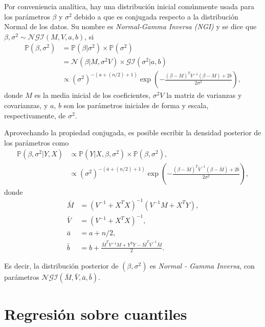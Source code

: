 Por conveniencia anal\'itica, hay una distribuci\'on inicial com\'unmente usada para los par\'ametros $\beta$ y $\sigma^2$ debido a que es conjugada respecto a la distribuci\'on Normal de los datos. Su nombre es \textit{Normal-Gamma Inversa (NGI)} y se dice que $\beta,\sigma^2 \sim \mathcal{NGI}(M,V,a,b)$, si
\begin{equation*}
\begin{aligned}
    \mathbb{P}(\beta,\sigma^2) 
    &= \mathbb{P}(\beta|\sigma^2) \times \mathbb{P}(\sigma^2) \\
    &= \mathcal{N}(\beta|M, \sigma^2 V) \times \mathcal{GI}(\sigma ^2|a,b) \\
    &\propto (\sigma^2)^{-(a+(n/2)+1)} \exp\left(-\frac{(\beta-M)^TV^{-1}(\beta-M) + 2b}{2\sigma^2}\right),
\end{aligned}
\end{equation*}
donde $M$ es la media inicial de los coeficientes, $\sigma^2 V$ la matriz de varianzas y covarianzas, y $a$, $b$ son los par\'ametros iniciales de forma y escala, respectivamente, de $\sigma ^2$. 

Aprovechando la propiedad conjugada, es posible escribir la densidad posterior de los par\'ametros como
\begin{equation*}
\begin{aligned}
    \mathbb{P}(\beta,\sigma^2 | Y, X) 
    &\propto \mathbb{P}(Y| X, \beta, \sigma^2) \times \mathbb{P}(\beta, \sigma^2), \\
    &\propto (\sigma^2)^{-(\bar{a}+(n/2)+1)} \exp\left(-\frac{(\beta-\bar{M})^T\bar{V}^{-1}(\beta-\bar{M}) + 2\bar{b}}{2\sigma^2}\right),
\end{aligned}
\end{equation*}
donde
\begin{equation*}
\begin{aligned}
    \bar{M} &= (V^{-1} + X^TX)^{-1} (V^{-1}M + X^TY), \\
    \bar{V} &= (V^{-1} + X^TX)^{-1}, \\
    \bar{a} &= a + n/2, \\
    \bar{b} &= b + \frac{\bar{M}^TV^{-1}M + Y^TY - \bar{M}^T\bar{V}^{-1}\bar{M}}{2}.
\end{aligned}
\end{equation*}

Es decir, la distribuci\'on posterior de $(\beta,\sigma^2)$ es \textit{Normal - Gamma Inversa}, con par\'ametros $\mathcal{NGI}(\bar{M},\bar{V},\bar{a},\bar{b})$.

\section{Regresión sobre cuantiles}

